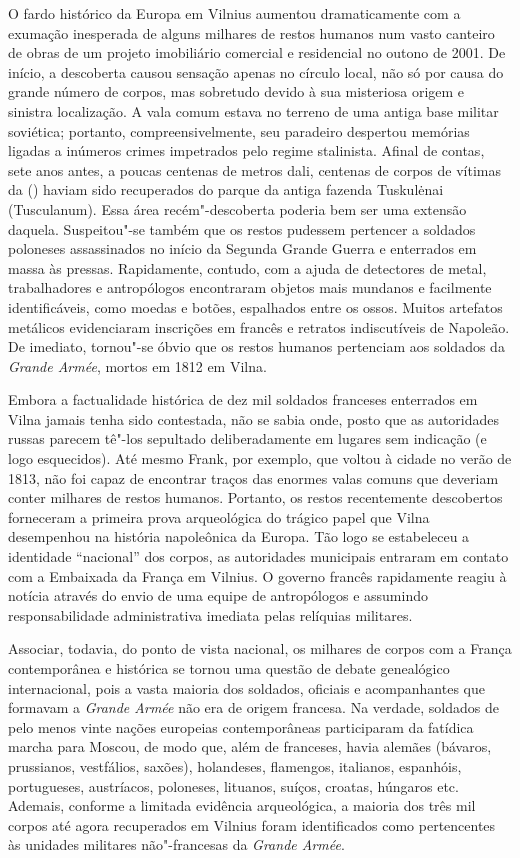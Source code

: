 O fardo histórico da Europa em Vilnius aumentou dramaticamente com a
exumação inesperada de alguns milhares de restos humanos num vasto
canteiro de obras de um projeto imobiliário comercial e residencial no
outono de 2001. De início, a descoberta causou sensação apenas no
círculo local, não só por causa do grande número de corpos, mas
sobretudo devido à sua misteriosa origem e sinistra localização. A vala
comum estava no terreno de uma antiga base militar soviética; portanto,
compreensivelmente, seu paradeiro despertou memórias ligadas a inúmeros
crimes impetrados pelo regime stalinista. Afinal de contas, sete anos
antes, a poucas centenas de metros dali, centenas de corpos de vítimas
da  () haviam sido recuperados do parque da antiga fazenda
Tuskulėnai (Tusculanum). Essa área recém"-descoberta poderia bem ser uma
extensão daquela. Suspeitou"-se também que os restos pudessem pertencer a
soldados poloneses assassinados no início da Segunda Grande Guerra e
enterrados em massa às pressas. Rapidamente, contudo, com a ajuda de
detectores de metal, trabalhadores e antropólogos encontraram objetos
mais mundanos e facilmente identificáveis, como moedas e botões,
espalhados entre os ossos. Muitos artefatos metálicos evidenciaram
inscrições em francês e retratos indiscutíveis de Napoleão. De imediato,
tornou"-se óbvio que os restos humanos pertenciam aos soldados da
\textit{Grande Armée}, mortos em 1812 em Vilna.

Embora a factualidade histórica de dez mil soldados franceses enterrados
em Vilna jamais tenha sido contestada, não se sabia onde, posto que as
autoridades russas parecem tê"-los sepultado deliberadamente em lugares
sem indicação (e logo esquecidos). Até mesmo Frank, por exemplo, que
voltou à cidade no verão de 1813, não foi capaz de encontrar traços das
enormes valas comuns que deveriam conter milhares de restos humanos.
Portanto, os restos recentemente descobertos forneceram a primeira prova
arqueológica do trágico papel que Vilna desempenhou na história
napoleônica da Europa. Tão logo se estabeleceu a identidade ``nacional''
dos corpos, as autoridades municipais entraram em contato com a
Embaixada da França em Vilnius. O governo francês rapidamente reagiu à
notícia através do envio de uma equipe de antropólogos e assumindo
responsabilidade administrativa imediata pelas relíquias militares.

Associar, todavia, do ponto de vista nacional, os milhares de corpos com
a França contemporânea e histórica se tornou uma questão de debate
genealógico internacional, pois a vasta maioria dos soldados, oficiais e
acompanhantes que formavam a \textit{Grande Armée} não era de origem
francesa. Na verdade, soldados de pelo menos vinte nações europeias
contemporâneas participaram da fatídica marcha para Moscou, de modo que,
além de franceses, havia alemães (bávaros, prussianos, vestfálios,
saxões), holandeses, flamengos, italianos, espanhóis, portugueses,
austríacos, poloneses, lituanos, suíços, croatas, húngaros etc. Ademais,
conforme a limitada evidência arqueológica, a maioria dos três mil
corpos até agora recuperados em Vilnius foram identificados como
pertencentes às unidades militares não"-francesas da \textit{Grande Armée}.


